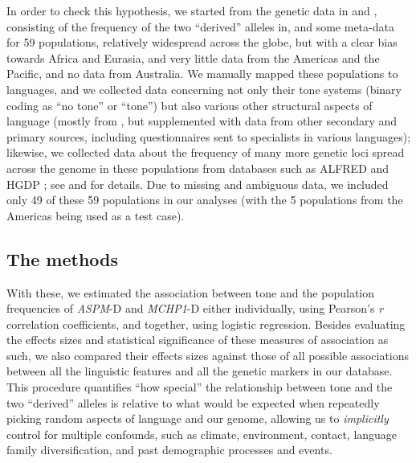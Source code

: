 \documentclass[twoside,onecolumn]{article}
\begin{document}
In order to check this hypothesis, we started from the genetic data in \citet{evans_microcephalin_2005} and \citet{mekelbobrov_aspm_2005}, consisting of the frequency of the two ``derived'' alleles in, and some meta-data for 59 populations, relatively widespread across the globe, but with a clear bias towards Africa and Eurasia, and very little data from the Americas and the Pacific, and no data from Australia.
We manually mapped these populations to languages, and we collected data concerning not only their tone systems (binary coding as ``no tone'' or ``tone'') but also various other structural aspects of language (mostly from \citealp{haspelmath_wals_2005}, but supplemented with data from other secondary and primary sources, including questionnaires sent to specialists in various languages); likewise, we collected data about the frequency of many more genetic loci spread across the genome in these populations from databases such as ALFRED \citep{rajeevan_alfred_2003} and HGDP \citep{cavallisforza_hdgp_2005}; see \citet{dediu_ladd_2007} and \citet{dediu_phd_2007} for details.
Due to missing and ambiguous data, we included only 49 of these 59 populations in our analyses (with the 5 populations from the Americas being used as a test case).

\subsection{The methods}

With these, we estimated the association between tone and the population frequencies of \textit{ASPM}-D and \textit{MCHP1}-D either individually, using Pearson’s \textit{r} correlation coefficients, and together, using logistic regression.
Besides evaluating the effects sizes and statistical significance of these measures of association as such, we also compared their effects sizes against those of all possible associations between all the linguistic features and all the genetic markers in our database.
This procedure quantifies ``how special'' the relationship between tone and the two ``derived'' alleles is relative to what would be expected when repeatedly picking random aspects of language and our genome, allowing us to \emph{implicitly} control for multiple confounds, such as climate, environment, contact, language family diversification, and past demographic processes and events.
\end{document}
